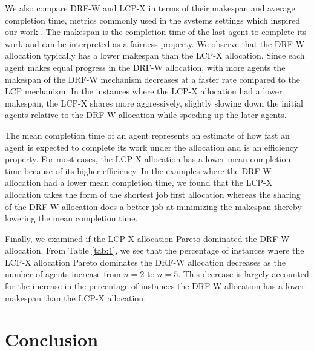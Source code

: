 \documentclass[letterpaper]{article} %
\theoremstyle{definition}
\begin{document}
We also compare DRF-W and LCP-X in terms of their makespan and average completion time, metrics commonly used in the systems settings which inspired our work \cite{Grandl2016Carbyne}. The makespan is the completion time of the last agent to complete its work and can be interpreted as a fairness property. We observe that the DRF-W allocation typically has a lower makespan than the LCP-X allocation. Since each agent makes equal progress in the DRF-W allocation, with more agents the makespan of the DRF-W mechanism decreases at a faster rate compared to the LCP mechanism. In the instances where the LCP-X allocation had a lower makespan, the LCP-X shares more aggressively, slightly slowing down the initial agents relative to the DRF-W allocation while speeding up the later agents. 


The mean completion time of an agent represents an estimate of how fast an agent is expected to complete its work under the allocation and is an efficiency property. For most cases, the LCP-X allocation has a lower mean completion time because of its higher efficiency. In the examples where the DRF-W allocation had a lower mean completion time, we found that the LCP-X allocation takes the form of the shortest job first allocation whereas the sharing of the DRF-W allocation does a better job at minimizing the makespan thereby lowering the mean completion time.   


Finally, we examined if the LCP-X allocation Pareto dominated the DRF-W allocation. From Table \ref{tab:1}, we see that the percentage of instances where the LCP-X allocation Pareto dominates the DRF-W allocation  decreases as the number of agents increase from $n = 2$ to $n = 5$. This decrease is largely accounted for the increase in the percentage of instances the DRF-W allocation has a lower makespan than the LCP-X allocation.

\section{Conclusion}

\iffalse %
We studied fair division for agents with limited demands. DRF-W allocations exhibit several fairness properties but are in general inefficient. LCP allocations are highly efficient but have relatively weak fairness properties.
We believe this is a reasonable trade-off because in system settings (e.g. \citet{Grandl2016Carbyne}, \citet{Hindman2011Mesos}, \citet{vavilapalli2013apacheHadoopYARN}), the primary objection to DRF is its lack of efficiency. In contrast, LCP yields substantial efficiency gains and in simulations still appears to generally be fair despite the existence of non-EF examples. For future work, based on our observation that there is room to improve the efficiency of DRF at essentially no cost to fairness which was motivated by \citet{Grandl2016Carbyne}, we plan to explore LCP on jobs composed of subtasks with a DAG structure. Another direction would be to investigate a market interpretation of the LCP similar to the works of \citet{goel2019markets}, and the Eisenberg-Gale convex program. One issue here is that usually EF can be shown from the convex program but we know that the LCP does not satisfy EF.
\fi
\end{document}
